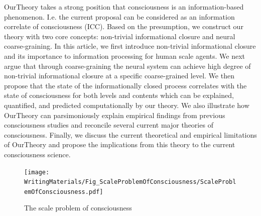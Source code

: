 \documentclass[utf8]{article}
\begin{document}
		
		\ac{OurTheory} takes a strong position that consciousness is an information-based phenomenon. I.e. the current proposal can be considered as an information correlate of consciousness (ICC). Based on the presumption, we construct our theory with two core concepts: non-trivial informational closure and neural coarse-graining. In this article, we first introduce non-trivial informational closure and its importance to information processing for human scale agents. We next argue that through coarse-graining the neural system can achieve high degree of non-trivial informational closure at a specific coarse-grained level. We then propose that the state of the informationally closed process correlates with the state of consciousness for both levels and contents which can be explained, quantified, and predicted computationally by our theory. We also illustrate how \ac{OurTheory} can parsimoniously explain empirical findings from previous consciousness studies and reconcile several current major theories of consciousness. Finally, we discuss the current theoretical and empirical limitations of \ac{OurTheory} and propose the implications from this theory to the current consciousness science. 


		\begin{figure}[H]
		    \centering
			\texttt{[image: WritingMaterials/Fig\_ScaleProblemOfConsciousness/ScaleProblemOfConsciousness.pdf]}
			\caption{The scale problem of consciousness}
	   	\end{figure}
\end{document}
